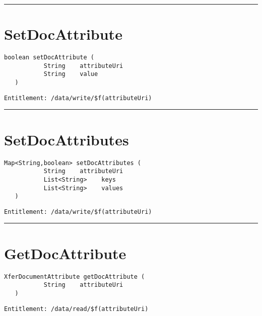 \rule{12cm}{2pt}
\section{SetDocAttribute}
\label{Api:SetDocAttribute}
\begin{lstlisting}[style=nonumbers]
   boolean setDocAttribute (
           String    attributeUri
           String    value
   )
\end{lstlisting}
\begin{Verbatim}[formatcom=\color{Maroon}]
  Entitlement: /data/write/$f(attributeUri)
\end{Verbatim}



\rule{12cm}{2pt}
\section{SetDocAttributes}
\label{Api:SetDocAttributes}
\begin{lstlisting}[style=nonumbers]
   Map<String,boolean> setDocAttributes (
           String    attributeUri
           List<String>    keys
           List<String>    values
   )
\end{lstlisting}
\begin{Verbatim}[formatcom=\color{Maroon}]
  Entitlement: /data/write/$f(attributeUri)
\end{Verbatim}



\rule{12cm}{2pt}
\section{GetDocAttribute}
\label{Api:GetDocAttribute}
\begin{lstlisting}[style=nonumbers]
   XferDocumentAttribute getDocAttribute (
           String    attributeUri
   )
\end{lstlisting}
\begin{Verbatim}[formatcom=\color{Maroon}]
  Entitlement: /data/read/$f(attributeUri)
\end{Verbatim}



